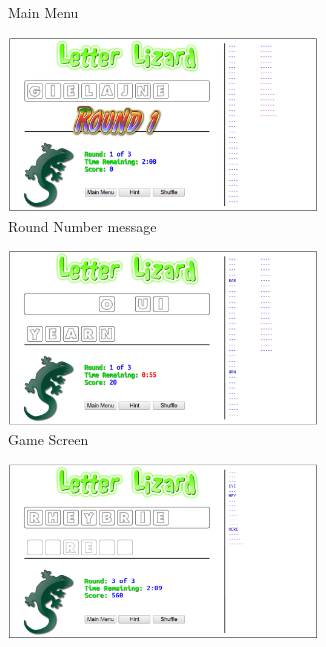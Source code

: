 \begin{figure}
\begin{subfigure}{0.49\textwidth}
        \caption{Main Menu}
        \label{lljsmm}
    \end{subfigure}
    \begin{subfigure}{0.49\textwidth}
        \includegraphics[width=0.9\textwidth]{../screenshots/LetterLizardJS-Round1.png}
        \caption{Round Number message}
        \label{lljsround}
    \end{subfigure}
    \begin{subfigure}{0.49\textwidth}
        \includegraphics[width=0.9\textwidth]{../screenshots/LetterLizardJS-Gameplay2.png}
        \caption{Game Screen}
        \label{lljsgame}
    \end{subfigure}    
    \begin{subfigure}{0.49\textwidth}
        \includegraphics[width=0.9\textwidth]{../screenshots/LetterLizardJS-Hint2.png}

\end{subfigure}
\end{figure}
